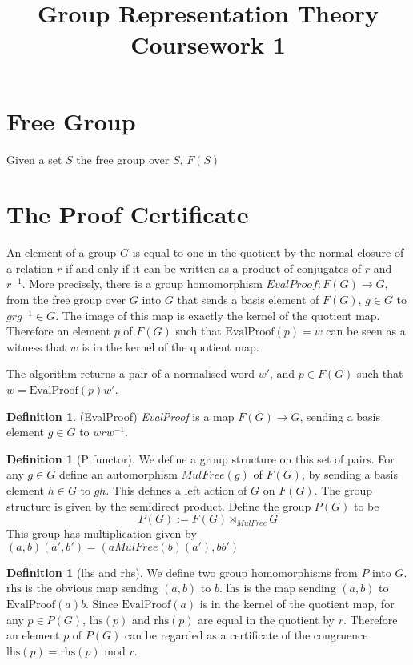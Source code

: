 \documentclass[11pt]{article} %
\title{Group Representation Theory Coursework 1}
\theoremstyle{definition}
\theoremstyle{definition}
\theoremstyle{definition}
\theoremstyle{definition}
\theoremstyle{definition}
\newtheorem{defn}[theorem]{Definition}
\theoremstyle{definition}
\newtheorem{subdef}{Definition}[theorem]
\begin{document}
\section{Free Group}

Given a set $S$ the free group over $S$, $F(S)$

\section{The Proof Certificate}

An element of a group $G$ is equal to one in the quotient by the normal closure
of a relation $r$ if and only if it can be written as a product of conjugates of $r$ and $r^{-1}$.
More precisely, there is a group homomorphism $\textit{EvalProof} : F(G) \to G$, from the free group
over $G$ into $G$ that sends a basis element of $F(G)$,
$g \in G$ to $grg^{-1} \in G$. The image of this map is exactly the kernel of the quotient map.
Therefore an element $p$ of $F(G)$ such that $\text{EvalProof}(p) = w$
can be seen as a witness that $w$ is in the kernel of the quotient map.

The algorithm returns a pair of a normalised word $w'$, and
$p \in F(G)$ such that \newline $w = \text{EvalProof}(p) w'$.

\begin{defn}(EvalProof)
  \textit{EvalProof} is a map $F(G)\to G$, sending a basis element $g \in G$ to $wrw^{-1}$.
\end{defn}

\begin{defn}[P functor]
  We define a group structure on this set of pairs.
  For any $g \in G$ define an automorphism $MulFree(g)$ of $F(G)$, by sending a basis
  element $h \in G$ to $gh$. This defines a left action of $G$ on $F(G)$. The group
  structure is given by the semidirect product. Define the group $P(G)$ to be
  \begin{equation}
  P(G) := F(G) \rtimes_{MulFree} G
  \end{equation}
  This group has multiplication given by $(a, b) (a', b') = (a MulFree(b)(a'), bb')$
\end{defn}

\begin{subdef}[lhs and rhs]
We define two group homomorphisms from $P$ into $G$. $\text{rhs}$ is the obvious map sending $(a, b)$ to $b$.
$\text{lhs}$ is the map sending $(a,b)$ to $\text{EvalProof}(a)b$.
Since $\text{EvalProof}(a)$ is in the kernel of the quotient map,
for any $p\in P(G)$, $\text{lhs}(p)$ and $\text{rhs}(p)$ are equal in the quotient by $r$.
Therefore an element $p$ of $P(G)$ can be regarded as a certificate of the congruence
$\text{lhs}(p) = \text{rhs}(p) \text{ mod } r$.
\end{subdef}
\end{document}
